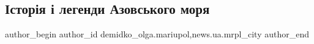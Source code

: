  
 
 
 
 
 
\subsection{Історія і легенди Азовського моря}
\label{sec:23_06_2018.stz.news.ua.mrpl_city.1.istoria_i_legendy_azovskogo}
 
\ifcmt
 author_begin
   author_id demidko_olga.mariupol,news.ua.mrpl_city
 author_end
\fi
